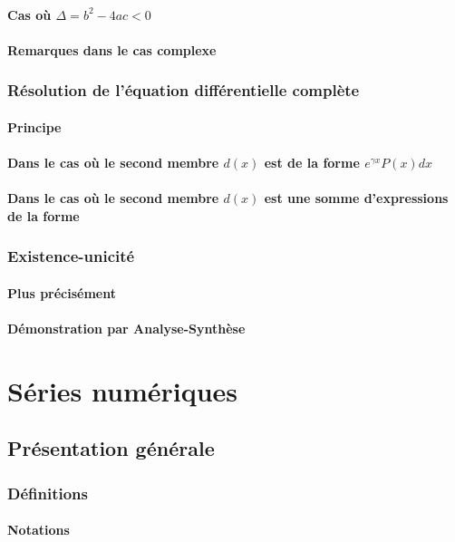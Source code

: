 \documentclass[12pt,a4paper,french]{book}
\begin{document}
			\subsubsection{Cas où $\Delta = b^{2}-4ac < 0$}
			\subsubsection{Remarques dans le cas complexe}
		\subsection{Résolution de l'équation différentielle complète}
			\subsubsection{Principe}
			\subsubsection{Dans le cas où le second membre $d(x)$ est de la forme  $e^{\gamma x}P(x)dx$}
			\subsubsection{Dans le cas où le second membre $d(x)$ est une somme d'expressions de la forme}
		\subsection{Existence-unicité}
			\subsubsection{Plus précisément}
			\subsubsection{Démonstration par Analyse-Synthèse}
			
\chapter{Séries numériques}
	\section{Présentation générale}
		\subsection{Définitions}
			\subsubsection{Notations}
\end{document}
